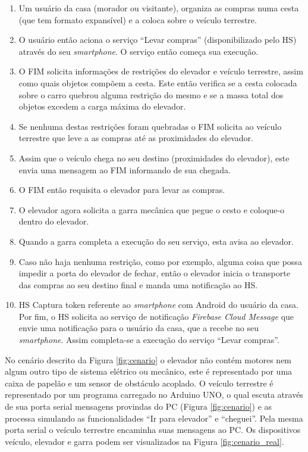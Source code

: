 \begin{enumerate}
\item Um usuário da casa (morador ou visitante), organiza as compras numa cesta (que tem formato expansível) e a coloca sobre o veículo terrestre.
\item O usuário então aciona o serviço ``Levar compras'' (disponibilizado pelo HS) através do seu \textit{smartphone}. O serviço então começa sua execução.
\item O FIM solicita informações de restrições do elevador e veículo terrestre, assim como quais objetos compõem a cesta. Este então verifica se a cesta colocada sobre o carro quebrou alguma restrição do mesmo e se a massa total dos objetos excedem a carga máxima do elevador.
\item Se nenhuma destas restrições foram quebradas o FIM solicita ao veículo terrestre que leve a as compras até as proximidades do elevador.
\item Assim que o veículo chega no seu destino (proximidades do elevador), este envia uma mensagem ao FIM informando de sua chegada.
\item O FIM então requisita o elevador para levar as compras.
\item O elevador agora solicita a garra mecânica que pegue o cesto e coloque-o dentro do elevador.
\item Quando a garra completa a execução do seu serviço, esta avisa ao elevador.
\item Caso não haja nenhuma restrição, como por exemplo, alguma coisa que possa impedir a porta do elevador de fechar, então o elevador inicia o transporte das compras ao seu destino final e manda uma notificação ao HS.
\item HS Captura token referente ao \textit{smartphone} com Android do usuário da casa. Por fim, o HS solicita ao serviço de notificação \textit{Firebase Cloud Message} que envie uma notificação para o usuário da casa, que a recebe no seu \textit{smartphone}. Assim completa-se a execução do serviço ``Levar compras''.
\end{enumerate}

No cenário descrito da Figura \ref{fig:cenario} o elevador não contém motores nem algum outro tipo de sistema elétrico ou mecânico, este é representado por uma caixa de papelão e um sensor de obstáculo acoplado. O veículo terrestre é representado por um programa carregado no Arduino UNO\footnotemark {}, o qual escuta através de sua porta serial mensagens provindas do PC (Figura \ref{fig:cenario}) e as processa simulando as funcionalidades ``Ir para elevador'' e ``cheguei''. Pela mesma porta serial o veículo terrestre encaminha suas mensagens ao PC. Os dispositivos veículo, elevador e garra podem ser visualizados na Figura \ref{fig:cenario_real}.

